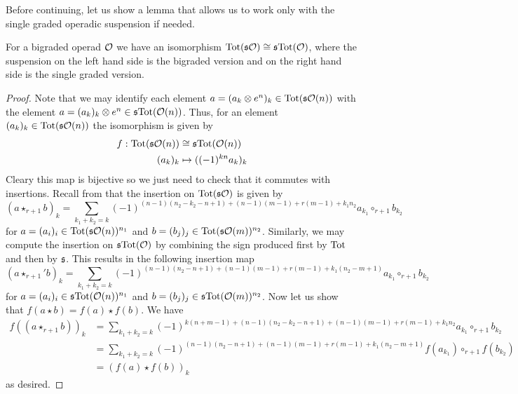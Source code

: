 \documentclass[twoside]{article}
\begin{document}
Before continuing, let us show a lemma that allows us to work only with the single graded operadic suspension if needed.
\begin{propo}\label{extrasign}
For a bigraded operad ${\mathcal O}$ we have an isomorphism $\mathrm{Tot}(\mathfrak{s}{\mathcal O})\cong \mathfrak{s} \mathrm{Tot}({\mathcal O})$, where the suspension on the left hand side is the bigraded version and on the right hand side is the single graded version. 
\end{propo}
\begin{proof}
 Note that we may identify each element $a=(a_k\otimes e^n )_k\in\mathrm{Tot}(\mathfrak{s}{\mathcal O}(n))$ with the element $a=(a_k)_k\otimes e^n\in\mathfrak{s}\mathrm{Tot}({\mathcal O}(n))$. Thus, for an element $(a_k)_k\in \mathrm{Tot}(\mathfrak{s}{\mathcal O}(n))$ the isomorphism is given by
\begin{align*}
f:\mathrm{Tot}(\mathfrak{s}{\mathcal O}(n))&\cong \mathfrak{s} \mathrm{Tot}({\mathcal O}(n))\\
(a_k)_k&\mapsto ((-1)^{kn}a_k)_k
\end{align*}
Cleary this map is bijective so we just need to check that it commutes with insertions. Recall from  that the insertion on $\mathrm{Tot}(\mathfrak{s}{\mathcal O})$ is given by
\begin{equation*}
(a\star_{r+1} b)_k=\sum_{k_1+k_2=k}(-1)^{(n-1)(n_2-k_2-n+1)+(n-1)(m-1)+r(m-1)+k_1n_2}a_{k_1}\circ_{r+1}b_{k_2}
\end{equation*}
for $a=(a_i)_i\in \mathrm{Tot}(\mathfrak{s}{\mathcal O}(n))^{n_1}$ and $b=(b_j)_j\in \mathrm{Tot}(\mathfrak{s}{\mathcal O}(m))^{n_2}$. Similarly, we may compute the insertion on $\mathfrak{s}\mathrm{Tot}({\mathcal O})$ by combining the sign produced first by $\mathrm{Tot}$ and then by $\mathfrak{s}$. This results in  the following insertion map 
\begin{equation*}
(a\star_{r+1}' b)_k=\sum_{k_1+k_2=k}(-1)^{(n-1)(n_2-n+1)+(n-1)(m-1)+r(m-1)+k_1(n_2-m+1)}a_{k_1}\circ_{r+1}b_{k_2}
\end{equation*}
for $a=(a_i)_i\in \mathfrak{s}\mathrm{Tot}({\mathcal O}(n))^{n_1}$ and $b=(b_j)_j\in \mathfrak{s}\mathrm{Tot}({\mathcal O}(m))^{n_2}$. Now let us show that $f(a\star b)=f(a)\star f(b)$. We have
\begin{align*}
f((a\star_{r+1} b))_k&=\sum_{k_1+k_2=k}(-1)^{k(n+m-1)+(n-1)(n_2-k_2-n+1)+(n-1)(m-1)+r(m-1)+k_1n_2}a_{k_1}\circ_{r+1}b_{k_2}\\
&=\sum_{k_1+k_2=k}(-1)^{(n-1)(n_2-n+1)+(n-1)(m-1)+r(m-1)+k_1(n_2-m+1)}f(a_{k_1})\circ_{r+1}f(b_{k_2})\\
&=(f(a)\star f(b))_k
\end{align*}
as desired.
\end{proof}
\end{document}
